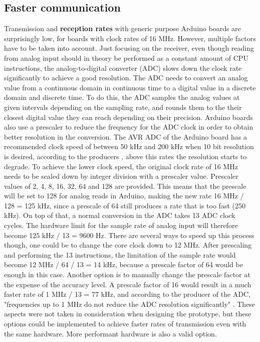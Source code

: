 
\subsection{Faster communication}
Transmission and \textbf{reception rates} with generic purpose Arduino boards are surprisingly low, for boards with clock rates of 16 MHz. 
However, multiple factors have to be taken into account.
Just focusing on the receiver, even though reading from analog input should in theory be performed as a constant amount of CPU instructions, the analog-to-digital converter (ADC) slows down the clock rate significantly to achieve a good resolution.
The ADC needs to convert an analog value from a continuous domain in continuous time to a digital value in a discrete domain and discrete time.
To do this, the ADC samples the analog values at given intervals depending on the sampling rate, and rounds them to the their closest digital value they can reach depending on their precision. 
Arduino boards also use a prescaler to reduce the frequency for the ADC clock in order to obtain better resolution in the conversion.
The AVR ADC of the Arduino board has a recommended clock speed of between 50 kHz and 200 kHz when 10 bit resolution is desired, according to the producers \cite{atmel}, above this rates the resolution starts to degrade.
To achieve the lower clock speed, the original clock rate of 16 MHz needs to be scaled down by integer division with a prescaler value.
Prescaler values of 2, 4, 8, 16, 32, 64 and 128 are provided. 
This means that the prescale will be set to 128 for analog reads in Arduino, making the new rate 16 MHz / 128 = 125 kHz, since a prescale of 64 still produces a rate that is too fast (250 kHz).
On top of that, a normal conversion in the ADC takes 13 ADC clock cycles.
The hardware limit for the sample rate of analog input will therefore become 125 kHz / 13 = 9600 Hz.
There are several ways to speed up this process though, one could be to change the core clock down to 12 MHz. 
After prescaling and performing the 13 instructions, the limitation of the sample rate would become 12 MHz / 64 / 13 = 14 kHz, because a prescale factor of 64 would be enough in this case.
Another option is to manually change the prescale factor at the expense of the accuracy level.
A prescale factor of 16 would result in a much faster rate of 1 MHz / 13 = 77 kHz, and according to the producer of the ADC, "frequencies up to 1 MHz do not reduce the ADC resolution significantly" \cite{atmel}. 
These aspects were not taken in consideration when designing the prototype, but these options could be implemented to achieve faster rates of transmission even with the same hardware.
More performant hardware is also a valid option.

